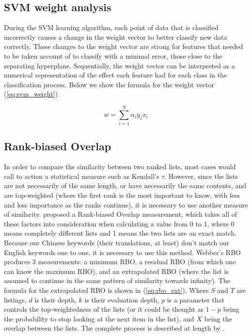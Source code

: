 \subsection{SVM weight analysis}\label{svmweightsanalysis}

During the SVM learning algorithm, each point of data that is classified incorrectly causes a change in the weight vector to better classify new data correctly. These changes to the weight vector are strong for features that needed to be taken account of to classify with a minimal error, those close to the separating hyperplane. Sequentially, the weight vector can be interpreted as a numerical representation of the effect each feature had for each class in the classification process. Below we show the formula for the weight vector (\ref{eq:svm_weight}).

\begin{equation}\label{eq:svm_weight}
w = \sum_{i=1}^N \alpha_i y_i x_i
\end{equation}

\subsection{Rank-biased Overlap}\label{rbo}

In order to compare the similarity between two ranked lists, most cases would call to action a statistical measure such as Kendall's \(\tau\). However, since the lists are not necessarily of the same length, or have necessarily the same contents, and are top-weighted (where the first rank is the most important to know, with less and less importance as the ranks continue), it is necessary to use another measure of similarity. \cite{webber2010similarity} proposed a Rank-biased Overlap \DIFaddbegin {}\DIFaddend measurement, which takes all of these factors into consideration when calculating a value from 0 to 1, where 0 means completely different lists and 1 means the two lists are an exact match. Because our Chinese keywords (their translations, at least) don't match our English keywords one to one, it is necessary to use this method. Webber's RBO produces 3 measurements: a minimum RBO, a residual RBO (from which one can know the maximum RBO), and an extrapolated RBO (where the list is assumed to continue in the same pattern of similarity towards infinity). The formula for the extrapolated RBO is shown in (\ref{eq:rbo_ext}), Where \(S\) and \(T\) are listings, \(d\) is their depth, \(k\) is their evaluation depth, \(p\) is a parameter that controls the top-weightedness of the lists (or it could be thought as \(1-p\) being the probability to stop looking at the next item in the list), and \(X\) being the overlap between the lists. The complete process is described at length by \cite{webber2010similarity}.

